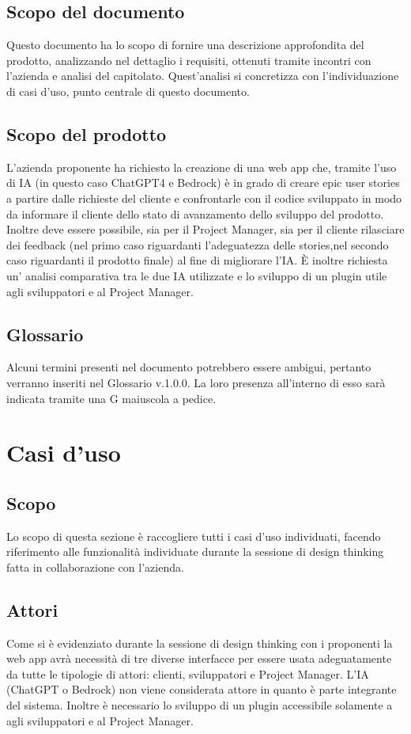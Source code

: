\documentclass{article}
\begin{document}
\subsection*{Scopo del documento}

Questo documento ha lo scopo di fornire una descrizione approfondita del prodotto, analizzando nel dettaglio i requisiti, ottenuti tramite incontri con l'azienda e analisi del capitolato. Quest'analisi si concretizza con l'individuazione di casi d'uso, punto centrale di questo documento.


\subsection*{Scopo del prodotto}
L'azienda proponente ha richiesto la creazione di una web app che, tramite l'uso di IA (in questo caso ChatGPT4 e Bedrock) è in grado di creare epic user stories a partire dalle richieste del cliente e confrontarle con il codice sviluppato in modo da informare il cliente dello stato di avanzamento dello sviluppo del prodotto. Inoltre deve essere possibile, sia per il Project Manager, sia per il cliente rilasciare dei feedback (nel primo caso riguardanti l'adeguatezza delle stories,nel secondo caso riguardanti il prodotto finale) al fine di migliorare l'IA. È inoltre richiesta un' analisi comparativa tra le due IA utilizzate e lo sviluppo di un plugin utile agli sviluppatori e al Project Manager.

\subsection*{Glossario}
Alcuni termini presenti nel documento potrebbero essere ambigui, pertanto verranno inseriti nel Glossario v.1.0.0. La loro presenza all'interno di esso sarà indicata tramite una G maiuscola a pedice.

\section*{Casi d'uso}
\subsection*{Scopo}
Lo scopo di questa sezione è raccogliere tutti i casi d'uso individuati, facendo riferimento alle funzionalità individuate durante la sessione di design thinking fatta in collaborazione con l'azienda.

\subsection*{Attori}
Come si è evidenziato durante la sessione di design thinking con i proponenti la web app avrà necessità di tre diverse interfacce per essere usata adeguatamente da tutte le tipologie di attori: clienti, sviluppatori e Project Manager. L'IA (ChatGPT o Bedrock) non viene considerata attore in quanto è parte integrante del sistema. Inoltre è necessario lo sviluppo di un plugin accessibile solamente a agli sviluppatori e al Project Manager.
\end{document}
